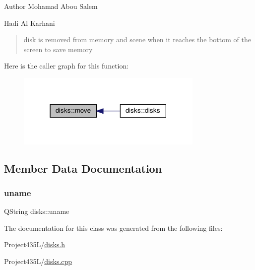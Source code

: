\begin{DoxyAuthor}{Author}
Mohamad Abou Salem 

Hadi Al Karhani 
\end{DoxyAuthor}
\begin{quote}
disk is removed from memory and scene when it reaches the bottom of the screen to save memory \end{quote}
Here is the caller graph for this function\+:
\nopagebreak
\begin{figure}[H]
\begin{center}
\leavevmode
\includegraphics[width=255pt]{classdisks_ad9b431cedd6b82de1327bd241f23ab06_icgraph}
\end{center}
\end{figure}


\subsection{Member Data Documentation}
\mbox{\label{classdisks_ae8b7e45a0c6d5c5f34b006ff825e6238}} 
\subsubsection{\texorpdfstring{uname}{uname}}
{\footnotesize\ttfamily Q\+String disks\+::uname\hspace{0.3cm}{\ttfamily [private]}}



The documentation for this class was generated from the following files\+:\begin{DoxyCompactItemize}
\item 
Project435\+L/\hyperlink{disks_8h}{disks.\+h}\item 
Project435\+L/\hyperlink{disks_8cpp}{disks.\+cpp}\end{DoxyCompactItemize}
